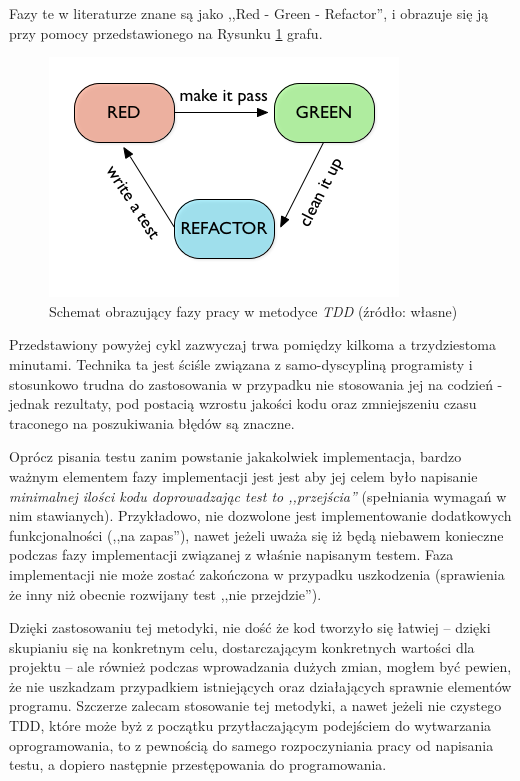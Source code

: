 \documentclass[pdflatex,11pt]{aghdpl}
\begin{document}
Fazy te w literaturze znane są jako ,,Red - Green - Refactor'', i obrazuje się ją przy pomocy przedstawionego na Rysunku \ref{tdd_cycle} grafu.

\begin{figure}[ch]
 \begin{center}
  \includegraphics[scale=0.8]{tdd_cycle}
 \end{center}
 \caption{Schemat obrazujący fazy pracy w metodyce \textit{TDD} \small{(źródło: własne)}}
 \label{tdd_cycle}
\end{figure}


Przedstawiony powyżej cykl zazwyczaj trwa pomiędzy kilkoma a trzydziestoma minutami. Technika ta jest ściśle związana z samo-dyscypliną programisty
i stosunkowo trudna do zastosowania w przypadku nie stosowania jej na codzień - jednak rezultaty, pod postacią wzrostu jakości kodu oraz zmniejszeniu 
czasu traconego na poszukiwania błędów są znaczne.

Oprócz pisania testu zanim powstanie jakakolwiek implementacja, bardzo ważnym elementem fazy implementacji jest jest aby jej celem 
było napisanie \textit{minimalnej ilości kodu doprowadzając test to ,,przejścia''} (spełniania wymagań w nim stawianych). Przykładowo, nie dozwolone jest
implementowanie dodatkowych funkcjonalności (,,na zapas''), nawet jeżeli uważa się iż będą niebawem konieczne podczas fazy implementacji związanej 
z właśnie napisanym testem. Faza implementacji nie może zostać zakończona w przypadku uszkodzenia (sprawienia że inny niż obecnie rozwijany test ,,nie przejdzie'').

Dzięki zastosowaniu tej metodyki, nie dość że kod tworzyło się łatwiej -- dzięki skupianiu się na konkretnym celu, dostarczającym konkretnych wartości dla projektu -- 
ale również podczas wprowadzania dużych zmian, mogłem być pewien, że nie uszkadzam przypadkiem istniejących oraz działających sprawnie elementów programu.
Szczerze zalecam stosowanie tej metodyki, a nawet jeżeli nie czystego TDD, które może byż z początku przytłaczającym podejściem do wytwarzania oprogramowania,
to z pewnością do samego rozpoczyniania pracy od napisania testu, a dopiero następnie przestępowania do programowania.
\end{document}
